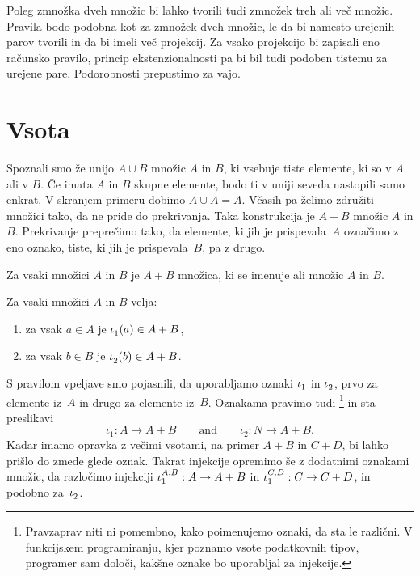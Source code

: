 Poleg zmnožka dveh množic bi lahko tvorili tudi zmnožek treh ali več množic. Pravila bodo
podobna kot za zmnožek dveh množic, le da bi namesto urejenih parov tvorili  in da bi imeli več projekcij. Za vsako projekcijo bi zapisali eno računsko
pravilo, princip ekstenzionalnosti pa bi bil tudi podoben tistemu za urejene pare.
Podorobnosti prepustimo za vajo.


\section{Vsota}
\label{sec:vsota}

Spoznali smo že unijo $A \cup B$ množic $A$ in $B$, ki vsebuje tiste elemente, ki so v $A$
ali v $B$. Če imata $A$ in $B$ skupne elemente, bodo ti v uniji seveda nastopili samo
enkrat. V skranjem primeru dobimo $A \cup A = A$. Včasih pa želimo združiti množici tako,
da ne pride do prekrivanja. Taka konstrukcija je  $A + B$ množic $A$ in $B$.
Prekrivanje preprečimo tako, da elemente, ki jih je prispevala~$A$ označimo z eno oznako,
tiste, ki jih je prispevala~$B$, pa z drugo.

\begin{pravilo}[Vsota]
  \label{vsota:tvorba}
  Za vsaki množici $A$ in $B$ je $A + B$ množica, ki se imenuje  ali
   množic $A$ in $B$.
\end{pravilo}

\begin{pravilo}
  \label{vsota:vpeljava}
  Za vsaki množici $A$ in $B$ velja:
  \begin{enumerate}
  \item za vsak $a \in A$ je $\inl(a) \in A + B$,
  \item za vsak $b \in B$ je $\inr(b) \in A + B$.
  \end{enumerate}
\end{pravilo}

S pravilom vpeljave smo pojasnili, da uporabljamo oznaki $\inl$ in $\inr$, prvo za
elemente iz~$A$ in drugo za elemente iz~$B$. Oznakama pravimo tudi
\footnote{Pravzaprav niti ni pomembno, kako poimenujemo oznaki, da sta le
  različni. V funkcijskem programiranju, kjer poznamo vsote podatkovnih tipov, programer
  sam določi, kakšne oznake bo uporabljal za injekcije.} in sta preslikavi
%
\begin{equation*}
  \iota_1 : A \to A + B
  \qquad\text{and}\qquad
  \iota_2 : N \to A + B.
\end{equation*}
%
Kadar imamo opravka z večimi vsotami, na primer $A + B$ in $C + D$, bi lahko prišlo do
zmede glede oznak. Takrat injekcije opremimo še z dodatnimi oznakami množic, da razločimo
injekciji $\inl[A][B] : A \to A + B$ in $\inl[C][D] : C \to C + D$, in podobno za~$\inr$.

